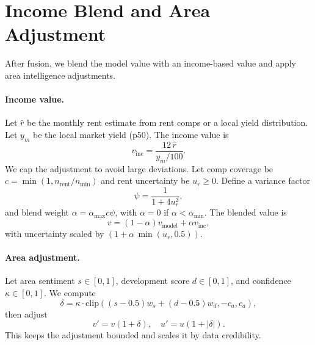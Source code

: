 \documentclass[11pt,a4paper]{article}
\begin{document}
\section{Income Blend and Area Adjustment}
After fusion, we blend the model value with an income-based value and apply
area intelligence adjustments.

\paragraph{Income value.}
Let $\hat{r}$ be the monthly rent estimate from rent comps or a local yield
distribution. Let $y_m$ be the local market yield (p50). The income value is
\begin{equation}
 v_{\text{inc}} = \frac{12\,\hat{r}}{y_m/100}.
\end{equation}
We cap the adjustment to avoid large deviations. Let comp coverage be
$c = \min(1, n_{\text{rent}}/n_{\min})$ and rent uncertainty be
$u_r \geq 0$. Define a variance factor
\begin{equation}
 \psi = \frac{1}{1 + 4 u_r^2},
\end{equation}
and blend weight $\alpha = \alpha_{\max} c \psi$, with
$\alpha = 0$ if $\alpha < \alpha_{\min}$. The blended value is
\begin{equation}
 v = (1-\alpha) v_{\text{model}} + \alpha v_{\text{inc}},
\end{equation}
with uncertainty scaled by $(1 + \alpha\,\min(u_r, 0.5))$.

\paragraph{Area adjustment.}
Let area sentiment $s \in [0,1]$, development score $d \in [0,1]$, and
confidence $\kappa \in [0,1]$. We compute
\begin{equation}
 \delta = \kappa \cdot \mathrm{clip}\left((s-0.5) w_s + (d-0.5) w_d, -c_a, c_a\right),
\end{equation}
then adjust
\begin{equation}
 v' = v (1 + \delta), \quad u' = u (1 + |\delta|).
\end{equation}
This keeps the adjustment bounded and scales it by data credibility.
\end{document}
